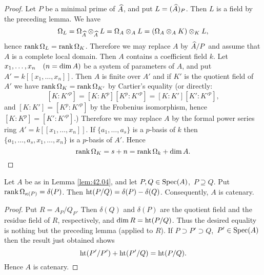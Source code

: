 \documentclass[../main]{subfiles}
\begin{document}
\begin{proof}
Let $P$ be a minimal prime of $\widehat{A}$, and put $L=(\widehat{A})_P$. Then $L$ is a field by the preceding lemma. We have \[\Omega_L=\Omega_{\widehat{A}} \otimes_{\widehat{A}} L=\Omega_A \otimes_A L=(\Omega_A \otimes_A K) \otimes_K L,\] hence $\operatorname{rank} \Omega_L=\operatorname{rank} \Omega_K$. Therefore we may replace $A$ by $\widehat{A} / P$ and assume that $A$ is a complete local domain. Then $A$ contains a coefficient field $k$. Let $x_1, \ldots, x_n\for{n=\dim A}$ be a system of parameters of $A$, and put $A'=k[[x_1, \ldots, x_n]]$. Then $A$ is finite over $A'$ and if $K'$ is the quotient field of $A'$ we have \newline $\operatorname{rank}\Omega_K=\operatorname{rank}\Omega_{K'}$ by Cartier's equality (or directly:
\[[K: K'^p]=[K: K^p][K^p: K'^p]=[K: K'][K': K'^p],\] and $[K: K']=[K^p: K'^p]$ by the Frobenius isomorphism, hence \newline $[K: K^p]=[K': K'^p]$.) Therefore we may replace $A$ by the formal power series ring $A'=k[[x_1, \ldots, x_n]]$. If $\{a_1, \ldots, a_s\}$ is a $p$-basis of $k$ then $\{a_1, \ldots, a_s, x_1, \ldots, x_n\}$ is a $p$-basis of $A'$. Hence \[\operatorname{rank} \Omega_K=s+n=\operatorname{rank} \Omega_k+\operatorname{dim} A.\]
\end{proof}

\begin{lemma}\label{lem:42.07}
Let $A$ be as in Lemma \ref{lem:42.04}, and let $P, Q \in \operatorname{Spec}(A)$, $\, P \supseteq Q$. Put $\operatorname{rank}\Omega_{\kappa(P)}=\delta(P)$. Then $\operatorname{ht}(P / Q)=\delta(P)-\delta(Q)$. Consequently, $A$ is catenary.
\end{lemma}

\begin{proof}
Put $R=A_P / Q_P$. Then $\delta(Q)$ and $\delta(P)$ are the quotient field and the residue field of $R$, respectively, and $\operatorname{dim} R=\operatorname{ht}(P / Q)$. Thus the desired equality is nothing but the preceding lemma (applied to $R$). If $P \supset P' \supset Q$, $\, P' \in \operatorname{Spec}(A)$ then the result just obtained shows \[\operatorname{ht}(P' / P')+\operatorname{ht}(P' / Q)=\operatorname{ht} (P / Q).\] Hence $A$ is catenary.
\end{proof}
\end{document}
